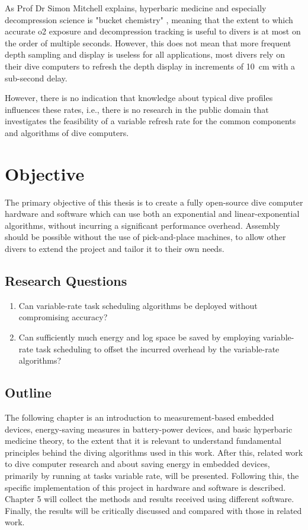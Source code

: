 As Prof Dr Simon Mitchell explains, hyperbaric medicine and especially decompression science is "bucket chemistry" \cite{2025-mitchell-personal-comm}, meaning that the extent to which accurate \gls{o2} exposure and decompression tracking is useful to divers is at most on the order of multiple seconds. However, this does not mean that more frequent depth sampling and display is useless for all applications, most divers rely on their dive computers to refresh the depth display in increments of \SI{10}{\cm} with a sub-second delay. 

However, there is no indication that knowledge about typical dive profiles influences these rates, i.e., there is no research in the public domain that investigates the feasibility of a variable refresh rate for the common components and algorithms of dive computers.

\section{Objective}
The primary objective of this thesis is to create a fully open-source dive computer hardware and software which can use both an exponential and linear-exponential algorithms, without incurring a significant performance overhead. 
Assembly should be possible without the use of pick-and-place machines, to allow other divers to extend the project and tailor it to their own needs.

\subsection{Research Questions}
\begin{enumerate}
\item Can variable-rate task scheduling algorithms be deployed without compromising accuracy?
\item Can sufficiently much energy and log space be saved by employing variable-rate task scheduling to offset the incurred overhead by the variable-rate algorithms?
\end{enumerate}

\subsection{Outline}
The following chapter is an introduction to measurement-based embedded devices, energy-saving measures in battery-power devices, and basic hyperbaric medicine theory, to the extent that it is relevant to understand fundamental principles behind the diving algorithms used in this work. 
After this, related work to dive computer research and about saving energy in embedded devices, primarily by running at tasks variable rate, will be presented.
Following this, the specific implementation of this project in hardware and software is described. 
Chapter 5 will collect the methods and results received using different software.
Finally, the results will be critically discussed and compared with those in related work.
